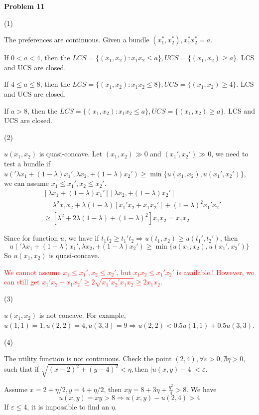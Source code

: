 \documentclass[letterpaper, 11pt]{article}
\newcommand{\1}{\mathds{1}}	%
\theoremstyle{definition}
\begin{document}
\textbf{Problem 11}

(1)

The preferences are continuous. Given a bundle $(x_1^*,x_2^*), x_1^*x_2^* = a$.

If $0<a<4$, then the $LCS = \{(x_1, x_2): x_1x_2 \leq a\}, UCS = \{(x_1,x_2) \geq a\}$. LCS and UCS are closed.

If $4 \leq a \leq 8$, then the $LCS = \{(x_1, x_2): x_1x_2 \leq 8\}, UCS = \{(x_1,x_2) \geq 4\}$. LCS and UCS are closed.

If $a > 8$, then the $LCS = \{(x_1, x_2): x_1x_2 \leq a\}, UCS = \{(x_1,x_2) \geq a\}$. LCS and UCS are closed.


(2)

$u(x_1,x_2)$ is quasi-concave. Let $(x_1, x_2) \gg 0$ and $(x_1',x_2') \gg 0$, we need to test a bundle if $u('\lambda x_1 + (1-\lambda)x_1',\lambda x_2, + (1-\lambda)x_2') \geq \min\{u(x_1,x_2), u(x_1',x_2')\}$, we can assume $x_1 \leq x_1', x_2 \leq x_2'$. \begin{align*}
     & [\lambda x_1 + (1-\lambda)x_1'] [\lambda x_2, + (1-\lambda)x_2']                        \\
     & = \lambda ^{2} x_1x_2 + \lambda(1-\lambda)[x_1'x_2 + x_1x_2'] + (1-\lambda)^{2}x_1'x_2' \\
     & \geq [\lambda ^{2} + 2\lambda(1-\lambda)+ (1-\lambda)^{2}]x_1x_2 = x_1x_2
\end{align*}

Since for function $u$, we have if $t_1t_2 \geq t_1't_2 \Longrightarrow u(t_1,x_2) \geq u(t_1',t_2')$, then \[
    u('\lambda x_1 + (1-\lambda)x_1',\lambda x_2, + (1-\lambda)x_2') \geq \min\{u(x_1,x_2), u(x_1',x_2')\}
\]
So $u(x_1,x_2)$ is quasi-concave.

\textcolor{red}{We cannot assume $x_1 \leq x_1', x_2 \leq x_2'$, but $x_1x_2 \leq x_1'x_2'$ is available.!
However, we can still get $x_1'x_2 + x_1x_2' \geq 2 \sqrt{x_1'x_2'x_1x_2} \geq 2 x_1x_2$.
}


(3)

$u(x_1,x_2)$ is not concave. For example, $u(1,1) = 1, u(2,2) = 4, u(3,3) = 9 \Longrightarrow u(2,2) < 0.5 u(1,1) + 0.5 u(3,3)$.

(4)

The utility function is not continuous. Check the point $(2,4), \forall \varepsilon > 0, \nexists \eta > 0$, such that if $\sqrt{(x-2)^{2} + (y-4)^{2}} < \eta, \text{then } \left| u(x,y) - 4 \right| < \varepsilon$.

Assume $x = 2+\eta/2, y = 4 + \eta/2$, then $xy = 8 + 3\eta + \frac{\eta ^{2}}{4} > 8$. We have \[
    u(x,y) = xy > 8 \Longrightarrow u(x,y) - u(2,4) > 4
\]
If $\varepsilon \leq 4$, it is impossible to find an $\eta$.
\end{document}
